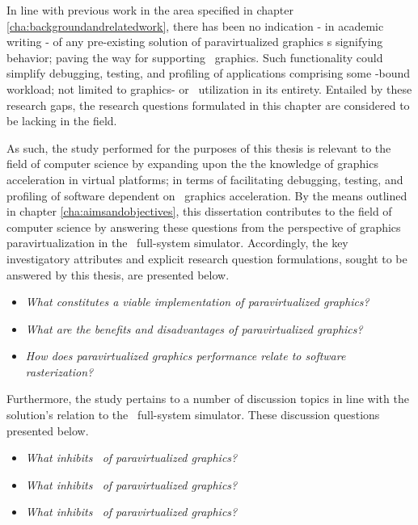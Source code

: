 In line with previous work in the area specified in chapter \ref{cha:backgroundandrelatedwork}, there has been no indication - in academic writing - of any pre-existing solution of paravirtualized graphics \dvttermapi s signifying  behavior; paving the way for supporting \dvttermreverseexecution\ graphics.
Such functionality could simplify debugging, testing, and profiling of applications comprising some \dvttermgpu -bound workload; not limited to graphics- or \dvttermgpu\ utilization in its entirety.
Entailed by these research gaps, the research questions formulated in this chapter are considered to be lacking in the field.

As such, the study performed for the purposes of this thesis is relevant to the field of computer science by expanding upon the the knowledge of graphics acceleration in virtual platforms; in terms of facilitating debugging, testing, and profiling of software dependent on \dvttermgpu\ graphics acceleration.
By the means outlined in chapter \ref{cha:aimsandobjectives}, this dissertation contributes to the field of computer science by answering these questions from the perspective of graphics paravirtualization in the \dvttermsimics\ full-system simulator.
Accordingly, the key investigatory attributes and explicit research question formulations, sought to be answered by this thesis, are presented below.

\newcommand*\researchquestionitem[2]{\item[#1:] \textit{#2}}
\begin{itemize}[noitemsep]
	\researchquestionitem{1}{What constitutes a viable implementation of paravirtualized graphics?}
	\researchquestionitem{2}{What are the benefits and disadvantages of paravirtualized graphics?}
	\researchquestionitem{3}{How does paravirtualized graphics performance relate to software rasterization?}
\end{itemize}

Furthermore, the study pertains to a number of discussion topics in line with the solution's relation to the \dvttermsimics\ full-system simulator. These discussion questions presented below.

\begin{itemize}[noitemsep]
	\researchquestionitem{1}{What inhibits \dvttermdeterministicexecution\ of paravirtualized graphics?}
	\researchquestionitem{2}{What inhibits \dvttermcheckpointing\ of paravirtualized graphics?}
	\researchquestionitem{3}{What inhibits \dvttermreverseexecution\ of paravirtualized graphics?}
\end{itemize}
